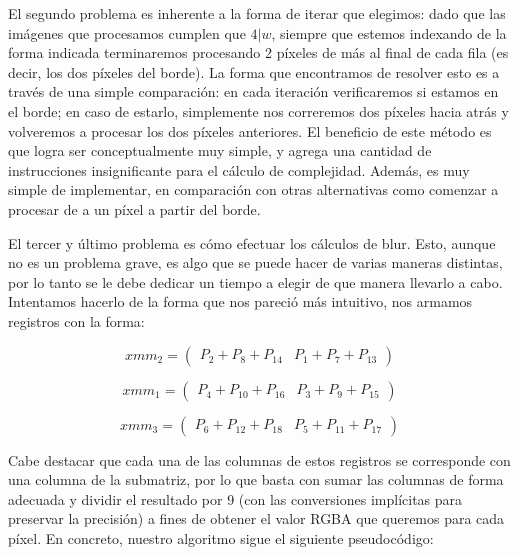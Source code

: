 El segundo problema es inherente a la forma de iterar que elegimos: dado que las imágenes que procesamos cumplen que $4 | w$, siempre que estemos indexando de la forma indicada terminaremos procesando 2 píxeles de más al final de cada fila (es decir, los dos píxeles del borde). La forma que encontramos de resolver esto es a través de una simple comparación: en cada iteración verificaremos si estamos en el borde; en caso de estarlo, simplemente nos correremos dos píxeles hacia atrás y volveremos a procesar los dos píxeles anteriores. El beneficio de este método es que logra ser conceptualmente muy simple, y agrega una cantidad de instrucciones insignificante para el cálculo de complejidad. Además, es muy simple de implementar, en comparación con otras alternativas como comenzar a procesar de a un píxel a partir del borde.

El tercer y último problema es cómo efectuar los cálculos de blur. Esto, aunque no es un problema grave, es algo que se puede hacer de varias maneras distintas, por lo tanto se le debe dedicar un tiempo a elegir de que manera llevarlo a cabo. Intentamos hacerlo de la forma que nos pareció más intuitivo, nos armamos registros con la forma:

$$xmm_2 = \begin{pmatrix} P_2 + P_8 + P_{14} & P_1 + P_7 + P_{13} \end{pmatrix}$$

$$xmm_1 = \begin{pmatrix} P_4 + P_{10} + P_{16} & P_3 + P_9 + P_{15}\end{pmatrix}$$

$$xmm_3 = \begin{pmatrix} P_6 + P_{12} + P_{18} & P_5 + P_{11} + P_{17}\end{pmatrix}$$

Cabe destacar que cada una de las columnas de estos registros se corresponde con una columna de la submatriz, por lo que basta con sumar las columnas de forma adecuada y dividir el resultado por 9 (con las conversiones implícitas para preservar la precisión) a fines de obtener el valor RGBA que queremos para cada píxel. En concreto, nuestro algoritmo sigue el siguiente pseudocódigo:

